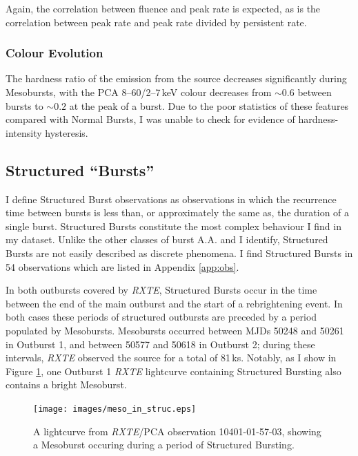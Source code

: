 Again, the correlation between fluence and peak rate is expected, as is the correlation between peak rate and peak rate divided by persistent rate.

\subsubsection{Colour Evolution}

\par The hardness ratio of the emission from the source decreases significantly during Mesobursts, with the PCA 8--60/2--7\,keV colour decreases from $\sim0.6$ between bursts to $\sim0.2$ at the peak of a burst.  Due to the poor statistics of these features compared with Normal Bursts, I was unable to check for evidence of hardness-intensity hysteresis.

\subsection{Structured ``Bursts''}

\par I define Structured Burst observations as observations in which the recurrence time between bursts is less than, or approximately the same as, the duration of a single burst.  Structured Bursts constitute the most complex behaviour I find in my dataset.  Unlike the other classes of burst \textsf{A.A.} and I identify, Structured Bursts are not easily described as discrete phenomena.  I find Structured Bursts in 54 observations which are listed in Appendix \ref{app:obs}.
\par In both outbursts covered by \textit{RXTE}, Structured Bursts occur in the time between the end of the main outburst and the start of a rebrightening event.  In both cases these periods of structured outbursts are preceded by a period populated by Mesobursts.  Mesobursts occurred between MJDs 50248 and 50261 in Outburst 1, and between 50577 and 50618 in Outburst 2; during these intervals, \textit{RXTE} observed the source for a total of 81\,ks.  Notably, as I show in Figure \ref{fig:meso_in_struc}, one Outburst 1 \textit{RXTE} lightcurve containing Structured Bursting also contains a bright Mesoburst.

\begin{figure}
  \centering
  \texttt{[image: images/meso\_in\_struc.eps]}
  \caption[A lightcurve from \textit{RXTE}/PCA observation 10401-01-57-03, showing a Mesoburst occuring during a period of Structured Bursting.]{\small A lightcurve from \textit{RXTE}/PCA observation 10401-01-57-03, showing a Mesoburst occuring during a period of Structured Bursting.}
  \label{fig:meso_in_struc}
\end{figure}


